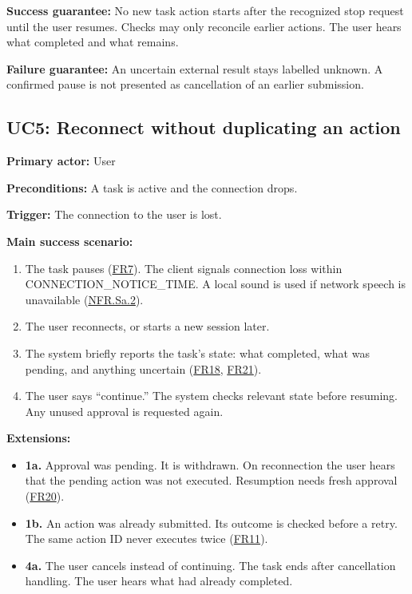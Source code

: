 \documentclass{scrreprt}
\theoremstyle{definition}
\newcommand{\reqlink}[1]{\hyperlink{req:#1}{#1}}
\begin{document}
\textbf{Success guarantee:} No new task action starts after the recognized stop request until the user resumes. Checks may only reconcile earlier actions. The user hears what completed and what remains.

\textbf{Failure guarantee:} An uncertain external result stays labelled unknown. A confirmed pause is not presented as cancellation of an earlier submission.

\subsection*{UC5: Reconnect without duplicating an action}

\textbf{Primary actor:} User

\textbf{Preconditions:} A task is active and the connection drops.

\textbf{Trigger:} The connection to the user is lost.

\textbf{Main success scenario:}
\begin{enumerate}
    \item The task pauses (\reqlink{FR7}). The client signals connection loss within CONNECTION\_NOTICE\_TIME. A local sound is used if network speech is unavailable (\reqlink{NFR.Sa.2}).
    \item The user reconnects, or starts a new session later.
    \item The system briefly reports the task's state: what completed, what was pending, and anything uncertain (\reqlink{FR18}, \reqlink{FR21}).
    \item The user says ``continue.'' The system checks relevant state before resuming. Any unused approval is requested again.
\end{enumerate}

\textbf{Extensions:}
\begin{itemize}
    \item \textbf{1a.} Approval was pending. It is withdrawn. On reconnection the user hears that the pending action was not executed. Resumption needs fresh approval (\reqlink{FR20}).
    \item \textbf{1b.} An action was already submitted. Its outcome is checked before a retry. The same action ID never executes twice (\reqlink{FR11}).
    \item \textbf{4a.} The user cancels instead of continuing. The task ends after cancellation handling. The user hears what had already completed.
\end{itemize}
\end{document}
